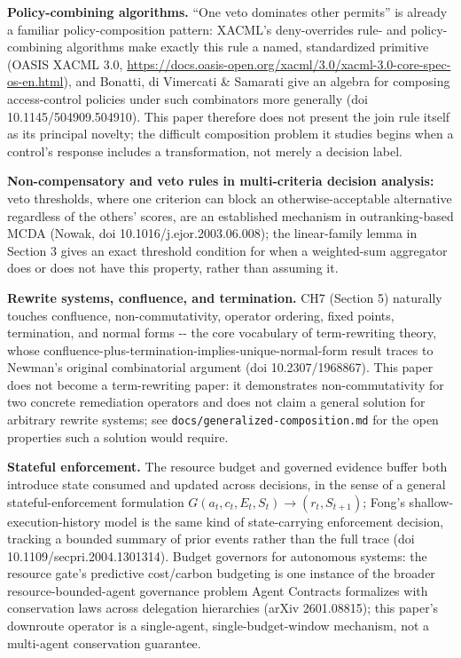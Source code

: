 \documentclass[11pt,a4paper]{article}
\theoremstyle{definition}
\begin{document}
\noindent\textbf{Policy-combining algorithms.} ``One veto dominates other permits'' is already a familiar policy-composition pattern: XACML's deny-overrides rule- and policy-combining algorithms make exactly this rule a named, standardized primitive (OASIS XACML 3.0, \url{https://docs.oasis-open.org/xacml/3.0/xacml-3.0-core-spec-os-en.html}), and Bonatti, di Vimercati \& Samarati give an algebra for composing access-control policies under such combinators more generally (doi 10.1145/504909.504910). This paper therefore does not present the join rule itself as its principal novelty; the difficult composition problem it studies begins when a control's response includes a transformation, not merely a decision label.

\noindent\textbf{Non-compensatory and veto rules in multi-criteria decision analysis:} veto thresholds, where one criterion can block an otherwise-acceptable alternative regardless of the others' scores, are an established mechanism in outranking-based MCDA (Nowak, doi 10.1016/j.ejor.2003.06.008); the linear-family lemma in Section 3 gives an exact threshold condition for when a weighted-sum aggregator does or does not have this property, rather than assuming it.

\noindent\textbf{Rewrite systems, confluence, and termination.} CH7 (Section 5) naturally touches confluence, non-commutativity, operator ordering, fixed points, termination, and normal forms -{}- the core vocabulary of term-rewriting theory, whose confluence-plus-termination-implies-unique-normal-form result traces to Newman's original combinatorial argument (doi 10.2307/1968867). This paper does not become a term-rewriting paper: it demonstrates non-commutativity for two concrete remediation operators and does not claim a general solution for arbitrary rewrite systems; see \texttt{docs/generalized-composition.md} for the open properties such a solution would require.

\noindent\textbf{Stateful enforcement.} The resource budget and governed evidence buffer both introduce state consumed and updated across decisions, in the sense of a general stateful-enforcement formulation $G(a_t,c_t,E_t,S_t) \to (r_t,S_{t+1})$; Fong's shallow-execution-history model is the same kind of state-carrying enforcement decision, tracking a bounded summary of prior events rather than the full trace (doi 10.1109/secpri.2004.1301314). Budget governors for autonomous systems: the resource gate's predictive cost/carbon budgeting is one instance of the broader resource-bounded-agent governance problem Agent Contracts formalizes with conservation laws across delegation hierarchies (arXiv 2601.08815); this paper's downroute operator is a single-agent, single-budget-window mechanism, not a multi-agent conservation guarantee.
\end{document}
